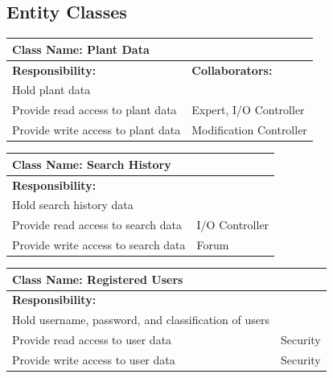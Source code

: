 \documentclass[]{article}
\begin{document}
\subsection{Entity Classes}
		\centering
		\begin{tabular}{|p{7cm}|p{7cm}|}
		\hline 
		 \multicolumn{2}{|l|}{\textbf{Class Name: Plant Data}} \\
		\hline
		\textbf{Responsibility:} & \textbf{Collaborators:} \\
		\hline
		Hold plant data & \\
		\hline
		Provide read access to plant data & Expert, I/O Controller \\
		\hline
		Provide write access to plant data & Modification Controller \\
		\hline
		\end{tabular}
	\newline
	\vspace*{0.5 cm}
	\newline

		\centering
		\begin{tabular}{|p{7cm}|p{7cm}|}
		\hline 
		 \multicolumn{2}{|l|}{\textbf{Class Name: Search History}} \\
		\hline
		\textbf{Responsibility:} & \text{Collaborators:} \\
		\hline
		Hold search history data & \\
		\hline
		Provide read access to search data & I/O Controller \\
		\hline
		Provide write access to search data & Forum \\
		\hline
		\end{tabular}
	\newline
	\vspace*{0.5 cm}
	\newline

		\centering
		\begin{tabular}{|p{7cm}|p{7cm}|}
		\hline 
		 \multicolumn{2}{|l|}{\textbf{Class Name: Registered Users}} \\
		\hline
		\textbf{Responsibility:} & \text{Collaborators:} \\
		\hline
		Hold username, password, and classification of users & \\
		\hline
		Provide read access to user data & Security \\
		\hline
		Provide write access to user data & Security \\
		\hline
		\end{tabular}
	\newline
	\vspace*{0.5 cm}
	\newline
\end{document}
